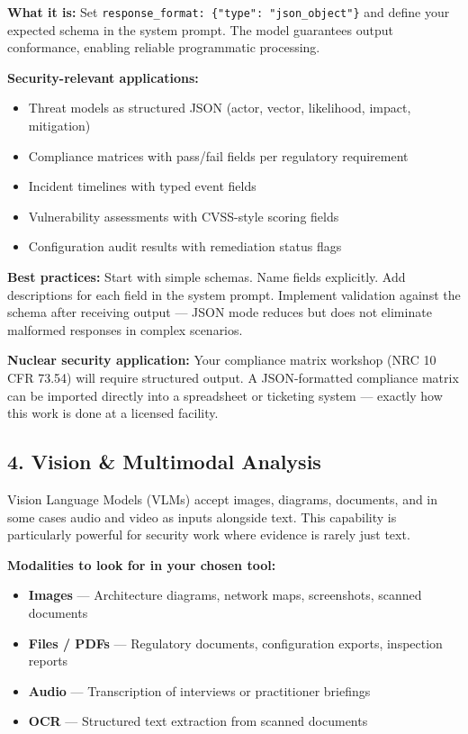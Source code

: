 \documentclass[9pt]{extarticle}
\begin{document}
\textbf{What it is:} Set \texttt{response\_format: \{"type": "json\_object"\}}
and define your expected schema in the system prompt. The model guarantees
output conformance, enabling reliable programmatic processing.

\medskip

\textbf{Security-relevant applications:}
\begin{itemize}
    \item Threat models as structured JSON (actor, vector, likelihood, impact, mitigation)
    \item Compliance matrices with pass/fail fields per regulatory requirement
    \item Incident timelines with typed event fields
    \item Vulnerability assessments with CVSS-style scoring fields
    \item Configuration audit results with remediation status flags
\end{itemize}

\textbf{Best practices:} Start with simple schemas. Name fields explicitly.
Add descriptions for each field in the system prompt. Implement validation
against the schema after receiving output --- JSON mode reduces but does not
eliminate malformed responses in complex scenarios.

\textbf{Nuclear security application:} Your compliance matrix workshop (NRC 10 CFR
73.54) will require structured output. A JSON-formatted compliance matrix can be
imported directly into a spreadsheet or ticketing system --- exactly how this
work is done at a licensed facility.

\subsection*{4. Vision \& Multimodal Analysis}

Vision Language Models (VLMs) accept images, diagrams, documents, and in some
cases audio and video as inputs alongside text. This capability is particularly
powerful for security work where evidence is rarely just text.

\medskip

\textbf{Modalities to look for in your chosen tool:}
\begin{itemize}
    \item \textbf{Images} --- Architecture diagrams, network maps, screenshots,
          scanned documents
    \item \textbf{Files / PDFs} --- Regulatory documents, configuration exports,
          inspection reports
    \item \textbf{Audio} --- Transcription of interviews or practitioner briefings
    \item \textbf{OCR} --- Structured text extraction from scanned documents
\end{itemize}
\end{document}
